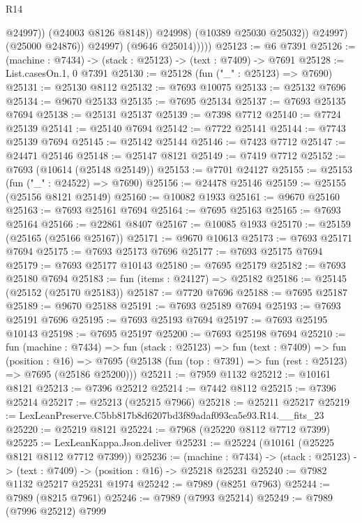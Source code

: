 \begin{lexlean}{R14}
\begin{coremodule}
                            @24997))
                        (@24003 @8126 @8148))
                      @24998)
                    (@10389 @25030 @25032))
                  @24997)
                (@25000 @24876))
              @24997)
            (@9646 @25014)))))
@25123 := @6 @7391
@25126 := (machine : @7434) -> (stack : @25123) -> (text : @7409) -> @7691
@25128 := List.casesOn.{1, 0} @7391
@25130 := @25128 (fun ("_" : @25123) => @7690)
@25131 := @25130 @8112
@25132 := @7693 @10075
@25133 := @25132 @7696
@25134 := @9670 @25133
@25135 := @7695 @25134
@25137 := @7693 @25135 @7694
@25138 := @25131 @25137
@25139 := @7398 @7712
@25140 := @7724 @25139
@25141 := @25140 @7694
@25142 := @7722 @25141
@25144 := @7743 @25139 @7694
@25145 := @25142 @25144
@25146 := @7423 @7712
@25147 := @24471 @25146
@25148 := @25147 @8121
@25149 := @7419 @7712
@25152 := @7693 (@10614 (@25148 @25149))
@25153 := @7701 @24127
@25155 := @25153 (fun ("_" : @24522) => @7690)
@25156 := @24478 @25146
@25159 := @25155 (@25156 @8121 @25149)
@25160 := @10082 @1933
@25161 := @9670 @25160
@25163 := @7693 @25161 @7694
@25164 := @7695 @25163
@25165 := @7693 @25164
@25166 := @22861 @8407
@25167 := @10085 @1933
@25170 := @25159 (@25165 (@25166 @25167))
@25171 := @9670 @10613
@25173 := @7693 @25171 @7694
@25175 := @7693 @25173 @7696
@25177 := @7693 @25175 @7694
@25179 := @7693 @25177 @10143
@25180 := @7695 @25179
@25182 := @7693 @25180 @7694
@25183 := fun (items : @24127) => @25182
@25186 := @25145 (@25152 (@25170 @25183))
@25187 := @7720 @7696
@25188 := @7695 @25187
@25189 := @9670 @25188
@25191 := @7693 @25189 @7694
@25193 := @7693 @25191 @7696
@25195 := @7693 @25193 @7694
@25197 := @7693 @25195 @10143
@25198 := @7695 @25197
@25200 := @7693 @25198 @7694
@25210 := fun (machine : @7434) =>
  fun (stack : @25123) =>
  fun (text : @7409) =>
  fun (position : @16) =>
  @7695 (@25138 (fun (top : @7391) => fun (rest : @25123) => @7695 (@25186 @25200)))
@25211 := @7959 @1132
@25212 := @10161 @8121
@25213 := @7396 @25212
@25214 := @7442 @8112
@25215 := @7396 @25214
@25217 := @25213 (@25215 @7966)
@25218 := @25211 @25217
@25219 := LexLeanPreserve.C5bb817b8d6207bd3f89adaf093ca5e93.R14.__fits_23
@25220 := @25219 @8121
@25224 := @7968 (@25220 @8112 @7712 @7399)
@25225 := LexLeanKappa.Json.deliver
@25231 := @25224 (@10161 (@25225 @8121 @8112 @7712 @7399))
@25236 := (machine : @7434) ->
  (stack : @25123) -> (text : @7409) -> (position : @16) -> @25218 @25231
@25240 := @7982 @1132 @25217 @25231 @1974
@25242 := @7989 (@8251 @7963)
@25244 := @7989 (@8215 @7961)
@25246 := @7989 (@7993 @25214)
@25249 := @7989 (@7996 @25212) @7999

\end{coremodule}
\end{lexlean}
